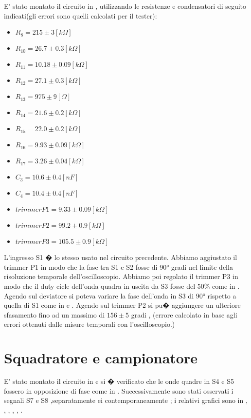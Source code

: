 E' stato montato il circuito in , utilizzando le resistenze e condensatori di seguito indicati(gli errori sono quelli calcolati per il tester):
\begin{itemize}
\item $R_8=215 \pm 3[k\Omega]$
\item $R_{10}=26.7 \pm 0.3[k\Omega]$
\item $R_{11}=10.18 \pm 0.09[k\Omega]$
\item $R_{12}=27.1 \pm 0.3[k\Omega]$
\item $R_{13}=975 \pm 9[\Omega]$
\item $R_{14}=21.6 \pm 0.2[k\Omega]$
\item $R_{15}=22.0 \pm 0.2[k\Omega]$
\item $R_{16}=9.93 \pm 0.09[k\Omega]$
\item $R_{17}=3.26 \pm 0.04[k\Omega]$
\item $C_3=10.6 \pm 0.4[nF]$
\item $C_4=10.4 \pm 0.4[nF]$
\item $trimmer P1 = 9.33 \pm  0.09[k\Omega]$
\item $trimmer P2 = 99.2 \pm  0.9[k\Omega]$
\item $trimmer P3 = 105.5 \pm  0.9[k\Omega]$
\end{itemize} 
L'ingresso S1 � lo stesso usato nel circuito precedente.
Abbiamo aggiustato il trimmer P1 in modo che la fase tra S1 e S2 fosse di \ang{90} gradi nel limite della risoluzione temporale dell'oscilloscopio.
Abbiamo poi regolato il trimmer P3 in modo che il duty cicle dell'onda quadra in uscita da S3 fosse del 50\% come in .
Agendo sul deviatore si poteva variare la fase dell'onda in S3 di \ang{90} rispetto a quella di S1 come in   e .
Agendo sul trimmer P2 si pu� aggiungere un ulteriore sfasamento fino ad un massimo di $156 \pm 5$ gradi , (errore calcolato in base agli errori ottenuti dalle misure temporali con l'oscilloscopio.)

\section{Squadratore e campionatore}
E' stato montato il circuito in  e si � verificato che le onde quadre in S4 e S5 fossero in opposizione di fase come in . Successivamente sono stati osservati i segnali S7 e S8 ,separatamente ei contemporaneamente ; i relativi grafici sono in , , , , , . 